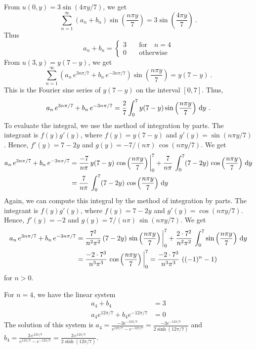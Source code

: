 \begin{egg}
From $\displaystyle u(0,y) = 3\sin\left(4\pi y/7\right)$, we
get
\[
\sum_{n=1}^\infty \left(a_n+ b_n\right)\sin\left(\frac{n\pi y}{7}\right) =
3\sin\left(\frac{4\pi y}{7}\right) \ .
\]
Thus
\[
a_n + b_n =
\begin{cases}
3 & \quad \text{for} \quad n=4 \\  
0 & \quad \text{otherwise}
\end{cases}
\]
From $u(3,y) = y(7-y)$, we get
\[
\sum_{n=1}^\infty \left(a_n\,e^{3n\pi /7}
+ b_n\,e^{-3n\pi /7}\right)\sin\left(\frac{n\pi y}{7}\right) = y(7-y) \ .
\]
This is the Fourier sine series of $y(7-y)$ on the interval $[0,7]$.
Thus,
\[
a_n\,e^{3n\pi /7} + b_n\,e^{-3n\pi /7} =
\frac{2}{7}\int_0^7 y(7-y) \sin\left(\frac{n\pi y}{7}\right) \dx{y} \ .
\]
To evaluate the integral, we use the method of integration by
parts.  The integrant is $f(y)g'(y)$, where $f(y)=y(7-y)$ and
$\displaystyle g'(y) = \sin\left(n\pi y/7\right)$.  Hence,
$f'(y) = 7-2y$ and
$\displaystyle g(y) = -7/(n\pi)\,\cos\left(n\pi y/7\right)$.
We get
\begin{align*}
a_n\,e^{3n\pi /7} + b_n\,e^{-3n\pi /7}
&= \frac{-7}{n\pi}\,y(7-y)\,\cos\left(\frac{n\pi y}{7}\right)\bigg|_0^7 +
\frac{7}{n\pi}\,\int_0^7 (7-2y)\,\cos\left(\frac{n\pi y}{7}\right)\,\mathrm{d}{y} \\
&= \frac{7}{n\pi}\,\int_0^7 (7-2y)\,\cos\left(\frac{n\pi y}{7}\right)\,\mathrm{d}{y}
\end{align*}
Again, we can compute this integral by the method of integration by
parts.  The integrant is $f(y)g'(y)$, where $f(y)=7-2y$ and
$\displaystyle g'(y) = \cos\left(n\pi y/7\right)$.  Hence,
$f'(y) = -2$ and $\displaystyle g(y) =
7/(n\pi) \,\sin\left(n\pi y/7\right)$.  We get
\begin{align*}
a_n\,e^{3n\pi /7} + b_n\,e^{-3n\pi /7}
&= \frac{7^2}{n^2\pi^2}\,(7-2y)\,\sin\left(\frac{n\pi y}{7}\right)\bigg|_0^7 +
\frac{2\cdot 7^2}{n^2\pi^2}\,\int_0^7
\sin\left(\frac{n\pi y}{7}\right)\,\mathrm{d}{y} \\
&= \frac{-2\cdot 7^3}{n^3\pi^3}\,\cos\left(\frac{n\pi y}{7}\right)\bigg|_0^7
= \frac{-2\cdot 7^3}{n^3\pi^3}\, \left((-1)^n - 1\right)
\end{align*}
for $n > 0$.

For $n=4$, we have the linear system
\begin{align*}
a_4 + b_4 &= 3 \\
a_4 e^{12\pi/7} + b_4 e^{-12\pi/7} &= 0
\end{align*}
The solution of this system is
$\displaystyle a_4 = \frac{-3 e^{-12\pi/7} }{e^{12\pi/7}-e^{-12\pi/7}}
= \frac{-3 e^{-12\pi/7} }{2\sinh(12\pi/7)}$
and
$\displaystyle b_4 = \frac{3\,e^{12\pi/7}}{e^{12\pi/7}-e^{-12\pi/7}}
= \frac{3\,e^{12\pi/7}}{2\sinh(12\pi/7)}$.


\end{egg}
